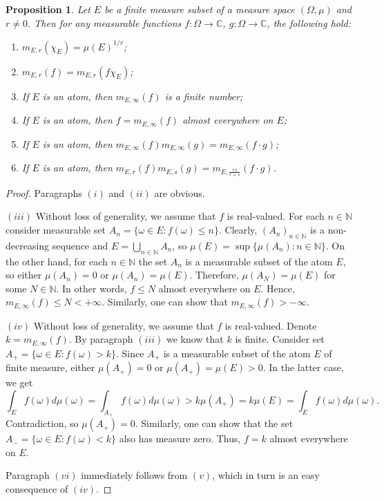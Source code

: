 \documentclass[12pt]{article}
\newtheorem{proposition}[theorem]{Proposition}
\begin{document}
\begin{proposition}\label{GnrlzdMeanProp}
    Let $E$ be a finite measure subset of a measure space $(\Omega,\mu)$ 
    and $r\neq 0$. Then for any measurable 
    functions $f:\Omega\to\mathbb{C}$, $g:\Omega\to\mathbb{C}$, the following 
    hold:
    \begin{enumerate}[label = (\roman*)]
        \item $m_{E,r}(\chi_E)=\mu(E)^{1/r}$;
        \item $m_{E,r}(f)=m_{E,r}(f\chi_E)$;
        \item If $E$ is an atom, then $m_{E,\infty}(f)$ is a finite number;
        \item If $E$ is an atom, then $f=m_{E,\infty}(f)$ almost 
        everywhere on $E$;
        \item If $E$ is an atom, 
        then $m_{E,\infty}(f)m_{E,\infty}(g)=m_{E,\infty}(f\cdot g)$;
        \item If $E$ is an atom, 
        then $m_{E,r}(f)m_{E,s}(g)=m_{E,\frac{rs}{r+s}}(f\cdot g)$.
    \end{enumerate}
\end{proposition}
\begin{proof}
    Paragraphs $(i)$ and $(ii)$ are obvious.

    $(iii)$ Without loss of generality, we assume that $f$ is real-valued.
    For each $n\in\mathbb{N}$ consider measurable 
    set $A_n=\{\omega\in E:f(\omega)\leq n\}$. Clearly, 
    $(A_n)_{n\in\mathbb{N}}$ is a non-decreasing sequence 
    and $E=\bigcup_{n\in\mathbb{N}}A_n$, 
    so $\mu(E)=\sup\{\mu(A_n):n\in\mathbb{N}\}$. On the other hand, for 
    each $n\in\mathbb{N}$ the set $A_n$ is a measurable subset of the atom $E$, 
    so either $\mu(A_n)=0$ or $\mu(A_n)=\mu(E)$. Therefore, $\mu(A_N)=\mu(E)$ for
    some $N\in\mathbb{N}$. In other words, $f\leq N$ almost everywhere on $E$.
    Hence, $m_{E,\infty}(f)\leq N<+\infty$. Similarly, one can show 
    that $m_{E,\infty}(f)>-\infty$.

    $(iv)$ Without loss of generality, we assume that $f$ is real-valued. 
    Denote $k=m_{E,\infty}(f)$. By paragraph $(iii)$ we know that $k$ is finite. 
    Consider set $A_+=\{\omega\in E: f(\omega)>k\}$. Since $A_+$ is a 
    measurable subset of the atom $E$ of finite measure, 
    either $\mu(A_+)=0$ or $\mu(A_+)=\mu(E)>0$. In the latter case, we get 
    \[
        \int_E f(\omega)d\mu(\omega)
        =\int_{A_+}f(\omega)d\mu(\omega)
        >k\mu(A_+)
        =k\mu(E)
        =\int_E f(\omega)d\mu(\omega).
    \]
    Contradiction, so $\mu(A_+)=0$. Similarly, one can show that the 
    set $A_-=\{\omega\in E:f(\omega)<k\}$ also has measure zero. Thus, $f=k$ 
    almost everywhere on $E$.

    Paragraph $(vi)$ immediately follows from $(v)$, which in turn is an easy 
    consequence of $(iv)$.
\end{proof}
\end{document}

